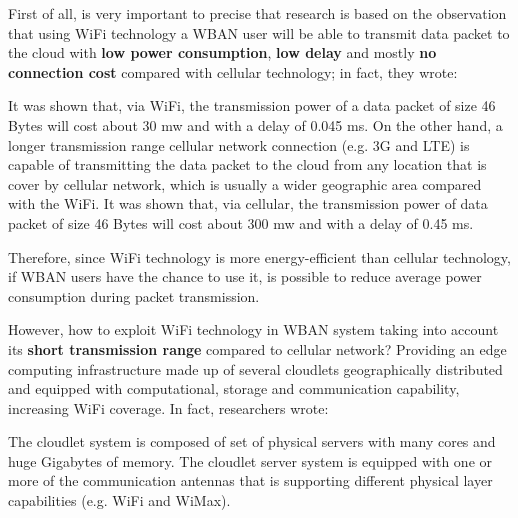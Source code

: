 \documentclass[sigchi]{acmart}
\begin{document}
First of all, is very important to precise that \citet{MSAReport} research is based on the observation that using WiFi technology a WBAN user will be able to transmit data packet to the cloud with \textbf{low power consumption}, \textbf{low delay} and mostly \textbf{no connection cost} compared with cellular technology; in fact, they wrote:

\vspace{0.3cm}

\begin{quoting}[font=itshape, begintext={``}, endtext={''\cite[par.~3.1]{MSAReport}}]
It was shown that, via WiFi, the transmission power of a data packet of size 46 Bytes will cost about 30 mw and with a delay of 0.045 ms. On the other hand, a longer transmission range cellular network connection (e.g. 3G and LTE) is capable of transmitting the data packet to the cloud from any location that is cover by cellular network, which is usually a wider geographic area compared with the WiFi. It was shown that, via cellular, the transmission power of data packet of size 46 Bytes will cost about 300 mw and with a delay of 0.45 ms.
\end{quoting}

\vspace{0.3cm}

Therefore, since WiFi technology is more energy-efficient than cellular technology, if WBAN users have the chance to use it, is possible to reduce average power consumption during packet transmission. 

However, how to exploit WiFi technology in WBAN system taking into account its \textbf{short transmission range} compared to cellular network? Providing an edge computing infrastructure made up of several cloudlets geographically distributed and equipped with computational, storage and communication capability, increasing WiFi coverage. In fact, researchers wrote:

\vspace{0.3cm}

\begin{quoting}[font=itshape, begintext={``}, endtext={''\cite[par.~4.1]{MSAReport}}]
The cloudlet system is composed of set of physical servers with many cores and huge Gigabytes of memory. The cloudlet server system is equipped with one or more of the communication antennas that is supporting different physical layer capabilities (e.g. WiFi and WiMax). 
\end{quoting}

\vspace{0.3cm}
\end{document}
